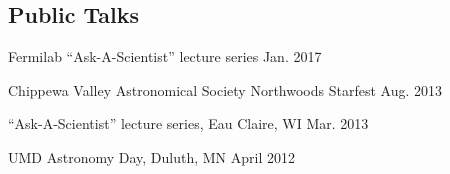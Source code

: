 \documentclass[11pt]{cv}
\begin{document}
\begin{cv}
\section{Public Talks}
\begin{etaremune}
  \item Fermilab ``Ask-A-Scientist'' lecture series \hfill Jan. 2017
  \item Chippewa Valley Astronomical Society Northwoods Starfest \hfill Aug. 2013
  \item ``Ask-A-Scientist'' lecture series, Eau Claire, WI \hfill Mar. 2013
  \item UMD Astronomy Day, Duluth, MN \hfill April 2012
\end{etaremune}



\end{cv}
\end{document}
